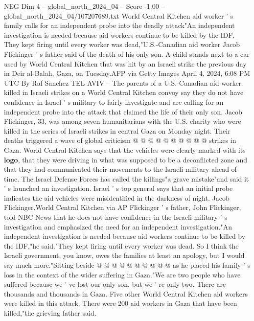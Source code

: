\begin{textsample}{NEG Dim 4 – global\_north\_2024\_04 – Score -1.00 – global\_north\_2024\_04/107207689.txt}  \label{ex:f4_neg_091}
World Central Kitchen aid worker ' s family calls for an independent probe into the deadly attack"An independent investigation is needed because aid workers continue to be killed by the IDF.
They kept firing until every worker was dead,"U.S.-Canadian aid worker Jacob Flickinger ' s father said of the death of his only son.
A child stands next to a car used by World Central Kitchen that was hit by an Israeli strike the previous day in Deir al-Balah, Gaza, on Tuesday.AFP via Getty Images April 4, 2024, 6:08 PM UTC By Raf Sanchez TEL AVIV -- The parents of a U.S.-Canadian aid worker killed in Israeli strikes on a World Central Kitchen convoy say they do not have confidence in Israel ' s military to fairly investigate and are calling for an independent probe into the attack that claimed the life of their only son.
Jacob Flickinger, 33, was among seven humanitarians with the U.S. charity who were killed in the series of Israeli strikes in central Gaza on Monday night.
Their deaths triggered a wave of global criticism @ @ @ @ @ @ @ @ @ @ strikes in Gaza.
World Central Kitchen says that the vehicles were clearly marked with its \textbf{logo}, that they were driving in what was supposed to be a deconflicted zone and that they had communicated their movements to the Israeli military ahead of time.
The Israel Defense Forces has called the killings"a grave mistake"and said it ' s launched an investigation.
Israel ' s top general says that an initial probe indicates the aid vehicles were misidentified in the darkness of night.
Jacob Flickinger.World Central Kitchen via AP Flickinger ' s father, John Flickinger, told NBC News that he does not have confidence in the Israeli military ' s investigation and emphasized the need for an independent investigation."An independent investigation is needed because aid workers continue to be killed by the IDF,"he said."They kept firing until every worker was dead.
So I think the Israeli government, you know, owes the families at least an apology, but I would say much more."Sitting beside @ @ @ @ @ @ @ @ @ @ as he placed his family ' s loss in the context of the wider suffering in Gaza."We are two people who have suffered because we ' ve lost our only son, but we ' re only two.
There are thousands and thousands in Gaza.
Five other World Central Kitchen aid workers were killed in this attack.
There were 200 aid workers in Gaza that have been killed,"the grieving father said.

\end{textsample}
